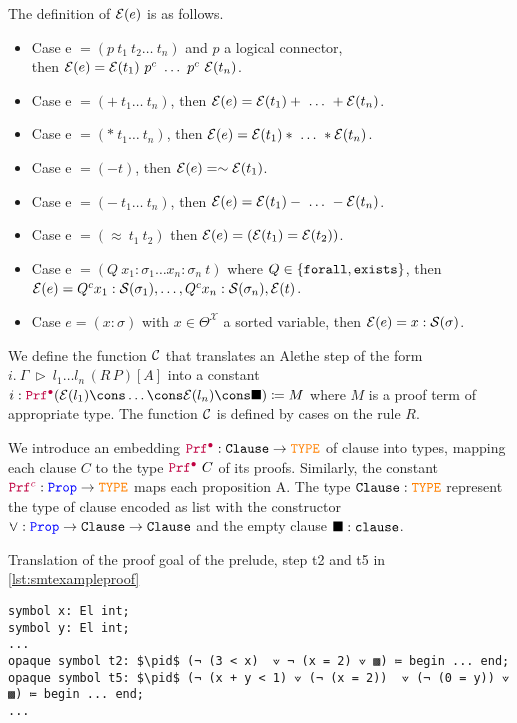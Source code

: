 \begin{definition}
The definition of $\E{e}$ is as follows.
\begin{itemize}
\setlength{\parskip}{0pt}
\item Case e $= (p~t_1~t_2\dots~t_n)$ and $p$ a logical connector,\\
  then $\E{e} = \E{t_1}~p^c~\dots~p^c~\E{t_n}$.
\item Case e $= (+~t_1\dots~t_n)$, then $\E{e} = \E{t_1} + ~\dots~ +\E{t_n}$.
\item Case e $= (*~t_1\dots~t_n)$, then $\E{e} = \E{t_1} * ~\dots~ *\E{t_n}$.
\item Case e $= (-t)$, then $\E{e} = \sim \E{t_1}$.
\item Case e $= (-~t_1\dots~t_n)$, then $\E{e} = \E{t_1} - ~\dots~ - \E{t_n}$.
\item Case e $= (\approx~t_1~t_2)$ then $\E{e} = (\E{t_1} = \E{t_2})$.
\item Case e $= (Q~x_1 : \sigma_1  \dots x_n : \sigma_n ~t)$ where $Q\in \{\kw{forall}, \kw{exists}\}$, then $\E{e} = Q^c x_1: \cal{S}(\sigma_1), \dots, Q^c x_n: \cal{S}(\sigma_n), \E{t}$. 
\item Case $e = (x: \sigma )$ with $x \in \Theta^\mathcal{X}$ a sorted variable, then $\E{e} = x: \cal{S}(\sigma)$.
\end{itemize}
\end{definition}

\begin{definition}
We define the function $\cal{C}$ that translates an Alethe step of the form $i.~\Gamma~\triangleright~l_1 \dots l_n\,(R\,P)[A]$ into a constant
$i: \pid (\E{l_1}\cons\dots\cons\E{l_n}\cons \nil) \coloneq M$ where $M$ is a proof term of appropriate type.
The function $\cal{C}$ is defined by cases on the rule $R$.
\end{definition}

We introduce an embedding $\pid: \tt{Clause} \ra \type$ of clause into types, mapping each clause $C$ to the type $\pid~C$ of its proofs.
Similarly, the constant $\pic: \prop \ra \type$ maps each proposition A. The type $\tt{Clause}: \type$ represent the type of clause encoded as list \cite[\S 3]{ColtellacciMD24}
with the constructor $\veedot: \prop \ra \tt{Clause} \ra \tt{Clause}$ and the empty clause $\nil: \tt{clause}$.


\begin{example}{Translation of the proof goal of the prelude, step t2 and t5 in \cref{lst:smtexampleproof}}
\begin{lstlisting}[language=Lambdapi,mathescape=true]
symbol x: El int;
symbol y: El int;
...
opaque symbol t2: $\pid$ (¬ (3 < x)  ⟇ ¬ (x = 2) ⟇ ▩) ≔ begin ... end;
opaque symbol t5: $\pid$ (¬ (x + y < 1) ⟇ (¬ (x = 2))  ⟇ (¬ (0 = y)) ⟇ ▩) ≔ begin ... end;
...
\end{lstlisting}
\end{example}

